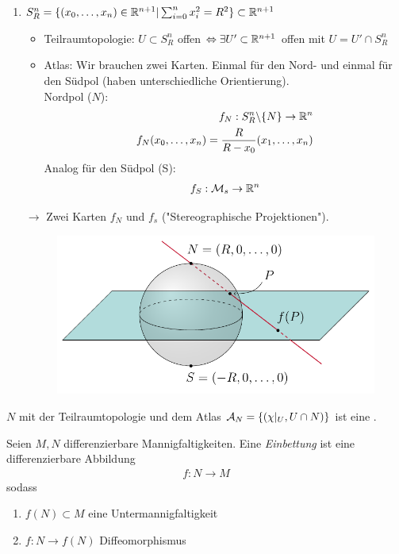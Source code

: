 \begin{bsp}
\begin{enumerate}
\item $S_R^n = \{ (x_0, \dots, x_n) \in \mathbb{R}^{n+1} \vert \sum_{i=0}^n x_i^2 = R^2 \} \subset \mathbb{R}^{n+1}$

\begin{itemize}
\item Teilraumtopologie: $U \subset S^n_R$ offen $\Leftrightarrow \exists U' \subset \mathbb{R}^{n+1}$ offen mit $U = U' \cap S^n_R$
\item Atlas: Wir brauchen zwei Karten. 
Einmal für den Nord- und einmal für den Südpol (haben unterschiedliche Orientierung).  \\
Nordpol ($N$):
\begin{align}
f_N : S^n_R \backslash \{ N \} \to \mathbb{R}^n \\
f_N (x_0, \dots , x_n) = \frac{R}{R- x_0} (x_1, \dots, x_n) 
\end{align}
Analog für den Südpol (S):
\begin{align}
f_S : \mathcal{M}_s \to \mathbb{R}^n
\end{align}
\end{itemize}
$\to$ Zwei Karten $f_N$ und $f_s$ ("Stereographische Projektionen").
\begin{figure}[H]
\centering
\includegraphics[scale=0.8]{figures/tikz/stereographic_projection.pdf}
\end{figure}
\end{enumerate}
\end{bsp}

\begin{bem}
$N$ mit der Teilraumtopologie und dem Atlas $\mathcal{A}_N = \left\{(\chi\vert_U, U\cap N)\right\}$ ist eine \difM.
\end{bem}

\begin{defs}
Seien $M, N$ differenzierbare Mannigfaltigkeiten. Eine \textit{Einbettung} ist eine differenzierbare Abbildung
\begin{align*}
f: N \rightarrow M
\end{align*}
sodass
\begin{enumerate}
\item$f(N)\subset M$ eine Untermannigfaltigkeit 
\item$f: N \rightarrow f(N)$ Diffeomorphismus
\end{enumerate}
\end{defs}

